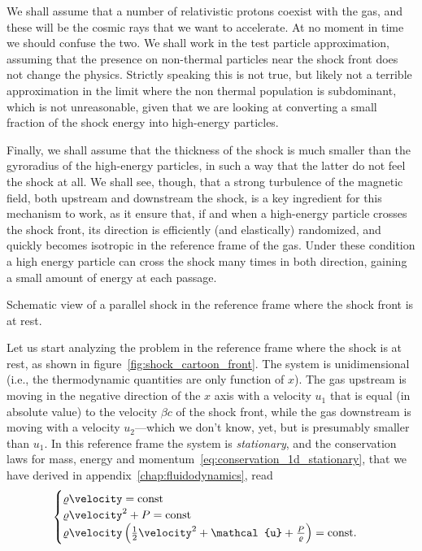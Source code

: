 We shall assume that a number of relativistic
protons coexist with the gas, and these will be the cosmic rays that we
want to accelerate. At no moment in time we should confuse the two. We shall work
in the test particle approximation, assuming that the presence on non-thermal
particles near the shock front does not change the physics. Strictly speaking this
is not true, but likely not a terrible approximation in the limit where the non
thermal population is subdominant, which is not unreasonable, given that we are
looking at converting a small fraction of the shock energy into high-energy particles.

Finally, we shall assume that the thickness of the shock is much smaller than the
gyroradius of the high-energy particles, in such a way that the latter do not
feel the shock at all. We shall see, though, that a strong turbulence of the magnetic
field, both upstream and downstream the shock, is a key ingredient for this mechanism
to work, as it ensure that, if and when a high-energy particle crosses the shock
front, its direction is efficiently (and elastically) randomized, and quickly becomes
isotropic in the reference frame of the gas. Under these condition a high energy
particle can cross the shock many times in both direction, gaining a small amount
of energy at each passage.

\begin{marginfigure}
  
  \caption{Schematic view of a parallel shock in the reference frame where the
  shock front is at rest.}
  \label{fig:shock_cartoon_front}
\end{marginfigure}

Let us start analyzing the problem in the reference frame where the shock is at rest,
as shown in figure~\ref{fig:shock_cartoon_front}. The system is unidimensional
(i.e., the thermodynamic quantities are only function of $x$). The gas upstream
is moving in the negative direction of the $x$ axis with a velocity $u_1$ that is
equal (in absolute value) to the velocity $\beta c$ of the shock front, while the gas
downstream is moving with a velocity $u_2$---which we don't know, yet, but is presumably
smaller than $u_1$. In this reference frame the system is \emph{stationary}, and
the conservation laws for mass, energy and momentum~\eqref{eq:conservation_1d_stationary},
that we have derived in appendix~\ref{chap:fluidodynamics}, read
\begin{align*}
  \begin{cases}
  \density \velocity = \text{const}\\
  \density \velocity^2 + \pressure = \text{const}\\
  \density \velocity \left( \frac{1}{2}\velocity^2 + \mathcal{u} +
    \frac{\pressure}{\density} \right) = \text{const}.
  \end{cases}
\end{align*}

